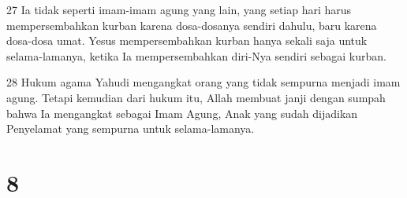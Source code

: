 \par 27 Ia tidak seperti imam-imam agung yang lain, yang setiap hari harus mempersembahkan kurban karena dosa-dosanya sendiri dahulu, baru karena dosa-dosa umat. Yesus mempersembahkan kurban hanya sekali saja untuk selama-lamanya, ketika Ia mempersembahkan diri-Nya sendiri sebagai kurban.
\par 28 Hukum agama Yahudi mengangkat orang yang tidak sempurna menjadi imam agung. Tetapi kemudian dari hukum itu, Allah membuat janji dengan sumpah bahwa Ia mengangkat sebagai Imam Agung, Anak yang sudah dijadikan Penyelamat yang sempurna untuk selama-lamanya.

\chapter{8}

